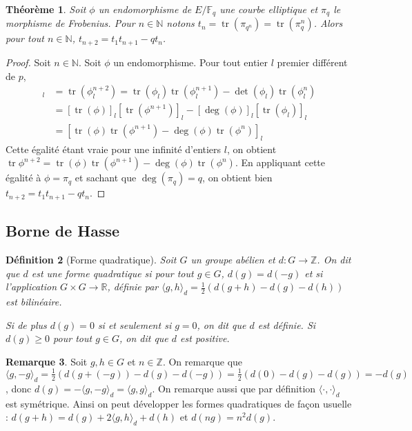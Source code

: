 \documentclass{article}
\theoremstyle{plain}%
\newtheorem{thm}{Théorème}[section]
\newtheorem{deff}[thm]{Définition}
\theoremstyle{definition}%
\newtheorem{rem}[thm]{Remarque}
\newcommand{\F}{\mathbb{F}}
\newcommand{\Z}{\mathbb{Z}}
\newcommand{\N}{\mathbb{N}}
\DeclareMathOperator{\tr}{tr}
\begin{document}
\begin{thm}
  \label{récurrence}
  Soit $\phi$ un endomorphisme de $E/\F_q$ une courbe elliptique et $\pi_q$ le morphisme de Frobenius. Pour $n\in\N$ notons $t_n = \tr(\pi_{q^n}) = \tr(\pi_q^n)$. Alors pour tout $n\in\N$, $t_{n+2} = t_1t_{n+1} - qt_n$.
\end{thm}

\begin{proof}
  Soit $n\in\N$. Soit $\phi$ un endomorphisme. Pour tout entier $l$ premier différent de $p$, 
  \begin{align*} 
    [\tr\phi^{n+2}]_l 
    &= \tr(\phi_l^{n+2}) 
    = \tr(\phi_l)\tr(\phi_l^{n+1})-\det(\phi_l)\tr(\phi_l^n) \\
    &= [\tr(\phi)]_l [\tr(\phi^{n+1})]_l-[\deg(\phi)]_l[\tr(\phi_l)]_l \\
    &= [\tr(\phi)\tr(\phi^{n+1})-\deg(\phi)\tr(\phi^n)]_l 
  \end{align*}
  Cette égalité étant vraie pour une infinité d'entiers $l$, on obtient $\tr\phi^{n+2} =  \tr(\phi)\tr(\phi^{n+1})-\deg(\phi)\tr(\phi^n)$. En appliquant cette égalité à $\phi = \pi_q$ et sachant que $\deg(\pi_q)=q$, on obtient bien $t_{n+2} = t_1t_{n+1}-qt_n$. 

\end{proof}
\subsection{Borne de Hasse}

\begin{deff}[Forme quadratique]
  Soit $G$ un groupe abélien et $d:G\to \Z$. On dit que $d$ est une forme quadratique si pour tout $g \in G$, $d(g) = d(-g)$ et si l'application $G\times G \to \mathbb R$, définie par  $\langle g, h\rangle_d = \frac{1}{2}(d(g+h) - d(g) -d(h))$ est bilinéaire.

  Si de plus $d(g) = 0$ si et seulement si $g=0$, on dit que $d$ est définie. Si $d(g) \ge 0$ pour tout $g\in G$, on dit que $d$ est positive.
\end{deff}

\begin{rem}
  Soit $g, h\in G$ et $n\in \Z$. On remarque que $\langle g, -g\rangle_d = \frac{1}{2}(d(g + (-g)) - d(g) -d(-g)) =\frac{1}{2}( d(0) - d(g) -d(g)) = -d(g)$, donc $d(g) = -\langle g, -g\rangle_d = \langle g, g\rangle_d$. On remarque aussi que par définition $\langle\cdot,\cdot\rangle_d$ est symétrique. Ainsi on peut développer les formes quadratiques de façon usuelle : $d(g+h) =  d(g) + 2\langle g, h\rangle_d + d(h)$ et $d(ng) = n^2d(g)$.
\end{rem}
\end{document}
